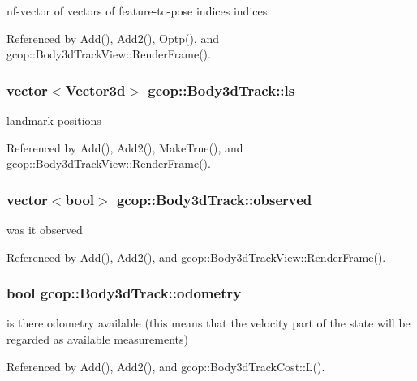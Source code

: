 nf-\/vector of vectors of feature-\/to-\/pose indices indices 



\-Referenced by \-Add(), \-Add2(), \-Optp(), and gcop\-::\-Body3d\-Track\-View\-::\-Render\-Frame().

\subsubsection[{ls}]{\setlength{\rightskip}{0pt plus 5cm}vector$<$\-Vector3d$>$ {\bf gcop\-::\-Body3d\-Track\-::ls}}\label{classgcop_1_1Body3dTrack_aef1a9df61f1d50afdd93de23a1dd5773}


landmark positions 



\-Referenced by \-Add(), \-Add2(), \-Make\-True(), and gcop\-::\-Body3d\-Track\-View\-::\-Render\-Frame().

\subsubsection[{observed}]{\setlength{\rightskip}{0pt plus 5cm}vector$<$bool$>$ {\bf gcop\-::\-Body3d\-Track\-::observed}}\label{classgcop_1_1Body3dTrack_a55a12776f61fccec234efa036af14638}


was it observed 



\-Referenced by \-Add(), \-Add2(), and gcop\-::\-Body3d\-Track\-View\-::\-Render\-Frame().

\subsubsection[{odometry}]{\setlength{\rightskip}{0pt plus 5cm}bool {\bf gcop\-::\-Body3d\-Track\-::odometry}}\label{classgcop_1_1Body3dTrack_af547f9b6ff12ac4c1ca67d466efaaf88}


is there odometry available (this means that the velocity part of the state will be regarded as available measurements) 



\-Referenced by \-Add(), \-Add2(), and gcop\-::\-Body3d\-Track\-Cost\-::\-L().

